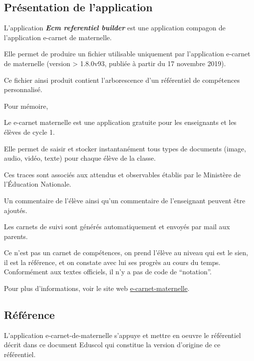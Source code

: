 \documentclass[oneside]{book}
\begin{document}
\hypertarget{pruxe9sentation-de-lapplication}{%
\subsection{Présentation de
l'application}\label{pruxe9sentation-de-lapplication}}

L'application \textbf{\emph{Ecm referentiel builder}} est une
application compagon de l'application e-carnet de maternelle.

Elle permet de produire un fichier utilisable uniquement par
l'application e-carnet de maternelle (version \textgreater{} 1.8.0v93,
publiée à partir du 17 novembre 2019).

Ce fichier ainsi produit contient l'arborescence d'un référentiel de
compétences personnalisé.

Pour mémoire,

Le e-carnet maternelle est une application
gratuite pour les enseignants et les élèves de cycle 1.

Elle permet de saisir et stocker instantanément tous types de documents
(image, audio, vidéo, texte) pour chaque élève de la classe.

Ces traces sont associés aux attendus et observables
établis par le Ministère de l'Éducation Nationale.

Un commentaire de l'élève ainsi qu'un commentaire de l'enseignant
peuvent être ajoutés.

Les carnets de suivi sont générés automatiquement et envoyés par mail
aux parents.

Ce n'est pas un carnet de compétences, on prend l'élève au niveau qui
est le sien, il est la référence, et on constate avec lui ses progrès au
cours du temps. Conformément aux textes officiels, il n'y a pas de code
de ``notation''.

Pour plus d'informations, voir le site web
\href{https://e-carnet-maternelle.jimdofree.com}{e-carnet-maternelle}.

\hypertarget{ruxe9fuxe9rence}{%
\subsection{Référence}\label{ruxe9fuxe9rence}}

L'application e-carnet-de-maternelle s'appuye et mettre en oeuvre le
référentiel décrit dans ce document
Eduscol qui constitue la version d'origine de ce
référentiel.
\end{document}
